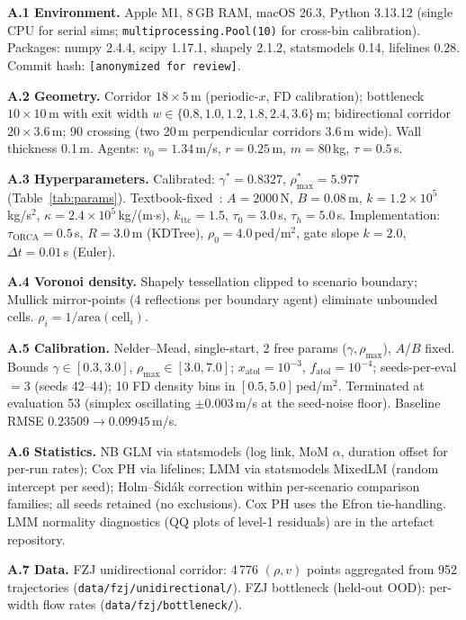 \documentclass[a4paper,twoside]{article}
\begin{document}
\footnotesize

\textbf{A.1 Environment.} Apple M1, 8\,GB RAM, macOS 26.3, Python 3.13.12 (single CPU for serial sims; \texttt{multiprocessing.Pool(10)} for cross-bin calibration). Packages: numpy 2.4.4, scipy 1.17.1, shapely 2.1.2, statsmodels 0.14, lifelines 0.28. Commit hash: \texttt{[anonymized for review]}.

\textbf{A.2 Geometry.} Corridor $18{\times}5$\,m (periodic-$x$, FD calibration); bottleneck $10{\times}10$\,m with exit width $w\!\in\!\{0.8,1.0,1.2,1.8,2.4,3.6\}$\,m; bidirectional corridor $20{\times}3.6$\,m; 90\textdegree{} crossing (two 20\,m perpendicular corridors 3.6\,m wide). Wall thickness 0.1\,m. Agents: $v_0{=}1.34$\,m/s, $r{=}0.25$\,m, $m{=}80$\,kg, $\tau{=}0.5$\,s.

\textbf{A.3 Hyperparameters.} Calibrated: $\gamma^*{=}0.8327$, $\rho_{\max}^*{=}5.977$ (Table~\ref{tab:params}). Textbook-fixed~\cite{Helbing00,Karamouzas14,VandenBerg11}: $A{=}2000$\,N, $B{=}0.08$\,m, $k{=}1.2{\times}10^{5}$\,kg/s$^2$, $\kappa{=}2.4{\times}10^{5}$\,kg/(m$\cdot$s), $k_{\text{ttc}}{=}1.5$, $\tau_0{=}3.0$\,s, $\tau_h{=}5.0$\,s. Implementation: $\tau_{\text{ORCA}}{=}0.5$\,s, $R{=}3.0$\,m (KDTree), $\rho_0{=}4.0$\,ped/m$^2$, gate slope $k{=}2.0$, $\Delta t{=}0.01$\,s (Euler).

\textbf{A.4 Voronoi density.} Shapely tessellation clipped to scenario boundary; Mullick mirror-points (4 reflections per boundary agent) eliminate unbounded cells. $\rho_i{=}1/\text{area}(\text{cell}_i)$.

\textbf{A.5 Calibration.} Nelder--Mead, single-start, 2 free params ($\gamma,\rho_{\max}$), $A$/$B$ fixed. Bounds $\gamma\!\in\![0.3,3.0]$, $\rho_{\max}\!\in\![3.0,7.0]$; $x_{\text{atol}}{=}10^{-3}$, $f_{\text{atol}}{=}10^{-4}$; seeds-per-eval $=3$ (seeds 42--44); 10 FD density bins in $[0.5,5.0]$\,ped/m$^2$. Terminated at evaluation 53 (simplex oscillating $\pm 0.003$\,m/s at the seed-noise floor). Baseline RMSE $0.23509\!\to\!0.09945$\,m/s.

\textbf{A.6 Statistics.} NB GLM via statsmodels (log link, MoM $\alpha$, duration offset for per-run rates); Cox PH via lifelines; LMM via statsmodels MixedLM (random intercept per seed); Holm--\v{S}id\'ak correction within per-scenario comparison families; all seeds retained (no exclusions). Cox PH uses the Efron tie-handling. LMM normality diagnostics (QQ plots of level-1 residuals) are in the artefact repository.

\textbf{A.7 Data.} FZJ unidirectional corridor: 4\,776 $(\rho,v)$ points aggregated from 952 trajectories (\texttt{data/fzj/unidirectional/}). FZJ bottleneck (held-out OOD): per-width flow rates (\texttt{data/fzj/bottleneck/}).
\end{document}
